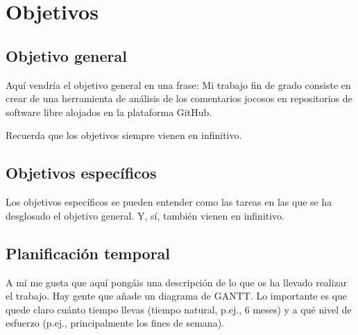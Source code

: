 \documentclass[a4paper, 12pt]{book}
\begin{document}

\cleardoublepage %
\chapter{Objetivos} %
\label{chap:objetivos} %

\section{Objetivo general} %
\label{sec:objetivo-general} %

Aquí vendría el objetivo general en una frase:
Mi trabajo fin de grado consiste en crear de una herramienta de análisis de los comentarios jocosos en repositorios de software libre alojados en la plataforma GitHub.

Recuerda que los objetivos siempre vienen en infinitivo.


\section{Objetivos específicos}
\label{sec:objetivos-especificos}

Los objetivos específicos se pueden entender como las tareas en las que se ha desglosado el objetivo general.
Y, sí, también vienen en infinitivo.


\section{Planificación temporal}
\label{sec:planificacion-temporal}

A mí me gusta que aquí pongáis una descripción de lo que os ha llevado realizar el trabajo.
Hay gente que añade un diagrama de GANTT.
Lo importante es que quede claro cuánto tiempo llevas (tiempo natural, p.ej., 6 meses) y a qué nivel de esfuerzo (p.ej., principalmente los fines de semana).


\end{document}
